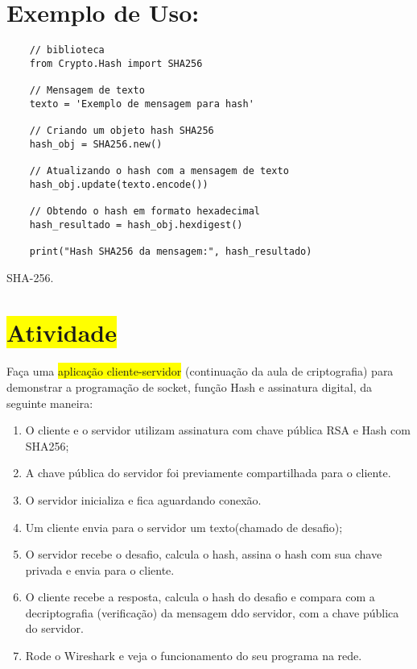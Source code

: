 \documentclass[a4paper,12pt]{article}
\begin{document}
\section{Exemplo de Uso:}

\begin{listing}[!ht]
    \begin{verbatim}
    // biblioteca
    from Crypto.Hash import SHA256

    // Mensagem de texto
    texto = 'Exemplo de mensagem para hash'

    // Criando um objeto hash SHA256
    hash_obj = SHA256.new()

    // Atualizando o hash com a mensagem de texto
    hash_obj.update(texto.encode())

    // Obtendo o hash em formato hexadecimal
    hash_resultado = hash_obj.hexdigest()

    print("Hash SHA256 da mensagem:", hash_resultado)

    \end{verbatim}
    \caption{SHA-256.}
\end{listing}

\section{\colorbox{yellow}{Atividade}}

Fa\c{c}a uma \colorbox{yellow}{aplica\c{c}\~ao cliente-servidor} (continua\c{c}\~ao da aula de criptografia) 
para demonstrar a programa\c{c}\~ao de socket, fun\c{c}\~ao Hash e assinatura digital, da 
seguinte maneira:

\begin{enumerate}
\item O cliente e o servidor utilizam assinatura com chave p\'ublica RSA e Hash com
SHA256;
\item A chave p\'ublica do servidor foi previamente compartilhada para o cliente.

\item O servidor inicializa e fica aguardando conex\~ao.
\item Um cliente envia para o servidor um texto(chamado de desafio);
\item O servidor recebe o desafio, calcula o hash, assina o hash com sua chave privada
e envia para o cliente.
\item O cliente recebe a resposta, calcula o hash do desafio e compara com a decriptografia
(verifica\c{c}\~ao) da mensagem ddo servidor, com a chave p\'ublica do servidor.
\item Rode o Wireshark e veja o funcionamento do seu programa na rede.
\end{enumerate}
\end{document}
